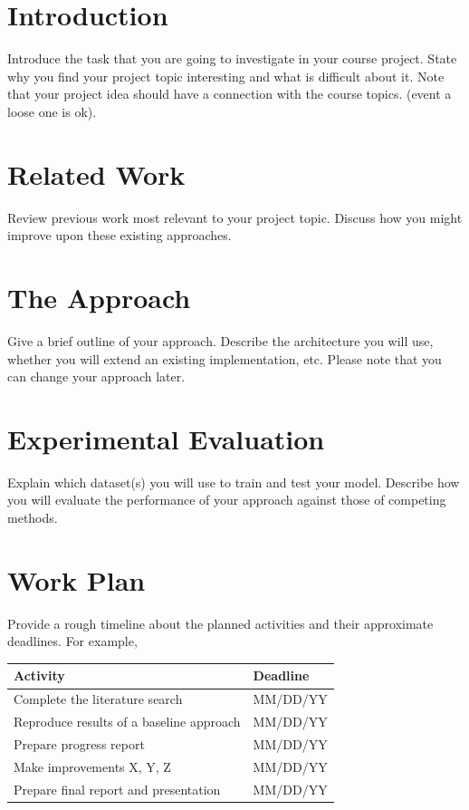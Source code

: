 \documentclass{article}
\begin{document}
\section{Introduction}
Introduce the task that you are going to investigate in your course project. State why you find your project topic interesting and what is difficult about it. Note that your project idea should have a connection with the course topics. (event a loose one is ok).

\section{Related Work}
Review previous work most relevant to your project topic. Discuss how you might improve upon these existing approaches.

\section{The Approach}
Give a brief outline of your approach. Describe the architecture you will use, whether you will extend an existing implementation, etc. Please note that you can change your approach later. 

\section{Experimental Evaluation}
Explain which dataset(s) you will use to train and test your model. Describe how you will evaluate the performance of your approach against those of competing methods.

\section{Work Plan}
Provide a rough timeline about the planned activities and their approximate deadlines. For example,

\begin{tabular}{|l|l|}
\hline
\textbf{Activity} & \textbf{Deadline} \\ 
\hline
Complete the literature search &	 MM/DD/YY \\
\hline
Reproduce results of a baseline approach &	MM/DD/YY \\ 
\hline
Prepare progress report &	MM/DD/YY \\
\hline
Make improvements X, Y, Z	& MM/DD/YY \\
\hline
Prepare final report and presentation & MM/DD/YY \\
\hline
\end{tabular}

\cite{Hinton:2006,Goodfellow:2014}



\end{document}

